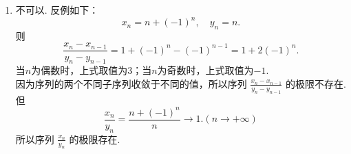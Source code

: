 \begin{enumerate}
\begin{solution}
\begin{enumerate}
            \item[(b)]
            不可以. 反例如下：
            \[
            x_{n}=n+(-1)^n,\quad y_{n}=n.
            \]
            则
            \[
            \frac{x_{n}-x_{n-1}}{y_{n}-y_{n-1}}=1+(-1)^n-(-1)^{n-1}=1+2(-1)^n.
            \]
            当$n$为偶数时，上式取值为$3$；当$n$为奇数时，上式取值为$-1$.\\
            因为序列的两个不同子序列收敛于不同的值，所以序列 $\displaystyle\frac{x_{n}-x_{n-1}}{y_{n}-y_{n-1}}$ 的极限不存在.\\
            但 \[
            \frac{x_{n}}{y_{n}}=\frac{n+(-1)^n}{n}\to 1.(n\to +\infty)
            \]
            所以序列 $\displaystyle\frac{x_{n}}{y_{n}}$ 的极限存在.
        \end{enumerate}
    \end{solution}


\end{enumerate}

